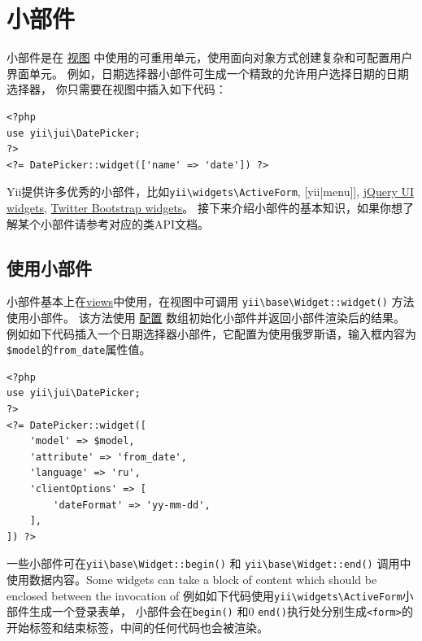 \label{structure-widgets.md}\section{小部件}
小部件是在 \hyperref[structure-views.md]{视图} 中使用的可重用单元，使用面向对象方式创建复杂和可配置用户界面单元。
例如，日期选择器小部件可生成一个精致的允许用户选择日期的日期选择器，
你只需要在视图中插入如下代码：

\lstset{language=php}\begin{lstlisting}
<?php
use yii\jui\DatePicker;
?>
<?= DatePicker::widget(['name' => 'date']) ?>
\end{lstlisting}
Yii提供许多优秀的小部件，比如\texttt{yii{\allowbreak{}\textbackslash}widgets{\allowbreak{}\textbackslash}ActiveForm}, [yii\widgets\Menu|menu]],
\hyperref[widget-jui.md]{jQuery UI widgets}, \hyperref[widget-bootstrap.md]{Twitter Bootstrap widgets}。
接下来介绍小部件的基本知识，如果你想了解某个小部件请参考对应的类API文档。

\subsection{使用小部件 \label{structure-widgets.md::using-widgets}}
小部件基本上在\hyperref[structure-views.md]{views}中使用，在视图中可调用 \texttt{yii{\allowbreak{}\textbackslash}base{\allowbreak{}\textbackslash}Widget\allowbreak{}::\allowbreak{}widget()} 方法使用小部件。
该方法使用 \hyperref[concept-configurations.md]{配置} 数组初始化小部件并返回小部件渲染后的结果。
例如如下代码插入一个日期选择器小部件，它配置为使用俄罗斯语，输入框内容为\lstinline|$model|的\lstinline|from_date|属性值。

\lstset{language=php}\begin{lstlisting}
<?php
use yii\jui\DatePicker;
?>
<?= DatePicker::widget([
    'model' => $model,
    'attribute' => 'from_date',
    'language' => 'ru',
    'clientOptions' => [
        'dateFormat' => 'yy-mm-dd',
    ],
]) ?>
\end{lstlisting}
一些小部件可在\texttt{yii{\allowbreak{}\textbackslash}base{\allowbreak{}\textbackslash}Widget\allowbreak{}::\allowbreak{}begin()} 和 \texttt{yii{\allowbreak{}\textbackslash}base{\allowbreak{}\textbackslash}Widget\allowbreak{}::\allowbreak{}end()} 调用中使用数据内容。Some widgets can take a block of content which should be enclosed between the invocation of
例如如下代码使用\texttt{yii{\allowbreak{}\textbackslash}widgets{\allowbreak{}\textbackslash}ActiveForm}小部件生成一个登录表单，
小部件会在\lstinline|begin()| 和0 \lstinline|end()|执行处分别生成\lstinline|<form>|的开始标签和结束标签，中间的任何代码也会被渲染。

